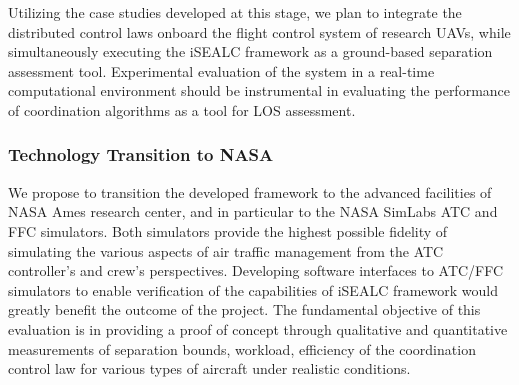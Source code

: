 \documentclass[letter,onecolumn,12pt]{aiaa-tc}
\newcommand{\1}{1_n}
\begin{document}
Utilizing the case studies developed at this stage, we plan to integrate the distributed control laws onboard the flight control system of research UAVs, while simultaneously executing the iSEALC framework as a ground-based separation assessment tool. Experimental evaluation of the system in a real-time computational environment should be instrumental in evaluating the performance of coordination algorithms as a tool for LOS assessment.


\subsubsection{Technology Transition to NASA}

We propose to transition the developed framework to the advanced facilities of NASA Ames research center, and in particular to the NASA SimLabs ATC and FFC simulators\cite{prevot2003distributed}. Both simulators provide the highest possible fidelity of simulating the various aspects of air traffic management from the ATC controller's and crew's perspectives. Developing software interfaces to ATC/FFC simulators to enable verification of the capabilities of iSEALC framework would greatly benefit the outcome of the project. The fundamental objective of this evaluation is in providing a proof of concept through qualitative and quantitative measurements of separation bounds, workload, efficiency of the coordination control law for various types of aircraft under realistic conditions.




\end{document}
